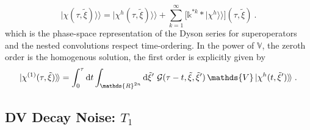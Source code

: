 \documentclass[%
reprint,
superscriptaddress,
nofootinbib,
 amsmath,amssymb,
prx,
floatfix,
]{revtex4-2}
\newcommand{\dket}[1]{\lvert #1 \rangle\!\rangle}
\begin{document}
\begin{equation}
    \label{eq:series}
    \dket{\chi(\tau,\tilde{\xi})} = \dket{\chi^{h} (\tau,\tilde{\xi})} + \sum_{k=1}^{\infty} \big[\mathds{k}^{*k}*\dket{\chi^{h}}\big](\tau,\tilde{\xi})\ .
\end{equation}
which is the phase-space representation of the Dyson series for superoperators and the nested convolutions respect time-ordering. In the power of $\mathds{V}$, the zeroth order is the homogenous solution, the first order is explicitly given by
\begin{equation}
    \label{eq:order1}
    \dket{\chi^{(1)}(\tau,\tilde{\xi})} = \int_0^\tau {\rm d}t \int_{\mathds{R}^{2n}} {\rm d}\tilde{\xi}'\ \mathcal{G}(\tau-t,\tilde{\xi},\tilde{\xi}')\,\mathds{V}\,\dket{\chi^{h}(t,\tilde{\xi}')} \;.  \nonumber
\end{equation}

\subsection{DV Decay Noise: $T_1$}
\end{document}
